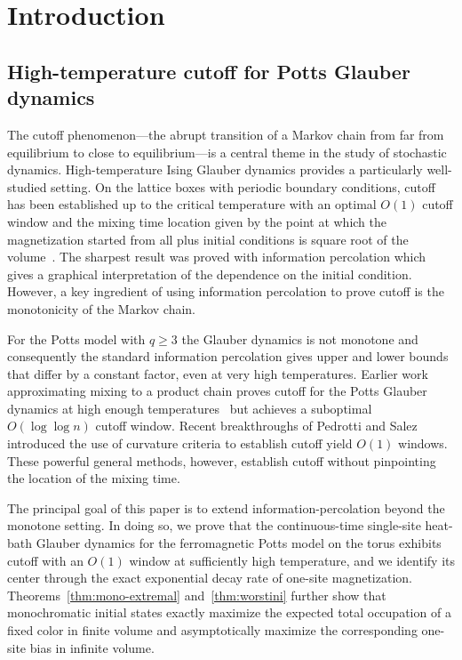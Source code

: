 \documentclass[letterpaper,11pt,reqno]{amsart}
\theoremstyle{definition}
\begin{document}

\section{Introduction}\label{sec:intro} 


\subsection{High-temperature cutoff for Potts Glauber dynamics}
The cutoff phenomenon---the abrupt transition of a Markov chain from far
from equilibrium to close to equilibrium---is a central theme in the study of stochastic dynamics. High-temperature Ising Glauber dynamics provides a particularly well-studied setting.  On the lattice boxes with periodic boundary conditions, cutoff has been established up to the critical temperature with an optimal $O(1)$ cutoff window and the mixing time location given by the point at which the magnetization started from all plus initial conditions is square root of the volume~\cites{IsingMeanfield,StochasticIP,Universality}. The sharpest result was proved with information percolation which gives a graphical interpretation of the dependence on the initial condition.  However, a key ingredient of using information percolation to prove cutoff is the monotonicity of the Markov chain.

For the Potts model with \(q\ge3\) the Glauber dynamics is not monotone and consequently the standard information percolation gives upper and lower bounds that differ by a constant factor, even at very high temperatures. Earlier work approximating mixing to a product chain proves cutoff for the Potts Glauber dynamics at high enough temperatures~\cites{CutoffSpin} but achieves a suboptimal $O(\log\log n)$ cutoff window. Recent breakthroughs of Pedrotti and Salez~\cites{SalezCurvature,PedrottiSalezLocalProduct} introduced the use of curvature criteria to establish cutoff yield $O(1)$ windows. These powerful general methods, however, establish cutoff without pinpointing the location of the mixing time.

The principal goal of this paper is to extend information-percolation beyond the monotone setting. In doing so, we prove that the continuous-time single-site heat-bath Glauber dynamics for the ferromagnetic Potts model on the torus exhibits cutoff with an \(O(1)\) window at sufficiently high temperature, and we identify its center through the exact exponential decay rate of one-site magnetization.
Theorems~\ref{thm:mono-extremal} and~\ref{thm:worstini} further show
that monochromatic initial states exactly maximize the expected total occupation of a fixed color in finite volume and asymptotically maximize the corresponding one-site bias in infinite volume.
\end{document}
